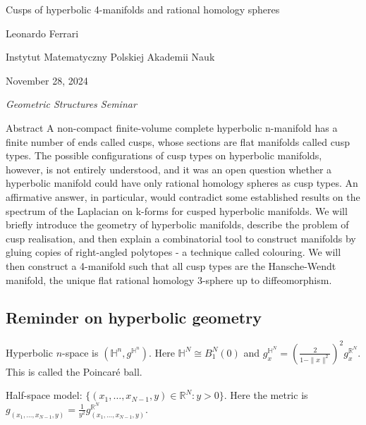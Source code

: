 \clearpage{}
{\Huge Cusps of hyperbolic 4-manifolds and rational homology spheres}

\hfill{\Large Leonardo Ferrari}

{\Large \hfill Instytut Matematyczny Polskiej Akademii Nauk}

\hfill{\large November 28, 2024

\hfill \textit{Geometric Structures Seminar}}
\vspace{2em}

\begin{thing6}{Abstract}
A non-compact finite-volume complete hyperbolic n-manifold has a finite number of ends called cusps, whose sections are flat manifolds called cusp types. The possible configurations of cusp types on hyperbolic manifolds, however, is not entirely understood, and it was an open question whether a hyperbolic manifold could have only rational homology spheres as cusp types. An affirmative answer, in particular, would contradict some established results on the spectrum of the Laplacian on k-forms for cusped hyperbolic manifolds. We will briefly introduce the geometry of hyperbolic manifolds, describe the problem of cusp realisation, and then explain a combinatorial tool to construct manifolds by gluing copies of right-angled polytopes - a technique called colouring. We will then construct a 4-manifold such that all cusp types are the Hansche-Wendt manifold, the unique flat rational homology 3-sphere up to diffeomorphism.
\end{thing6}
\vspace{2em}
\subsection{Reminder on hyperbolic geometry}

Hyperbolic $n$-space is $(\mathbb{H}^n,g^{\mathbb{H}^n})$. Here $\mathbb{H}^N\cong B_1^N(0)$ and $g^{\mathbb{H}^N}_x=\left( \frac{2}{1-\|x\|^2} \right)^2 g^{\mathbb{R}^N}_x$. This is called the Poincaré ball.

Half-space model: $\{(x_1,\ldots,x_{N-1},y) \in \mathbb{R}^N:y>0\}$. Here the metric is $g_{(x_1,\ldots,x_{N-1},y)}=\frac{1}{y^2}g^{\mathbb{R}^N}_(x_1,\ldots,x_{N-1},y)$.


